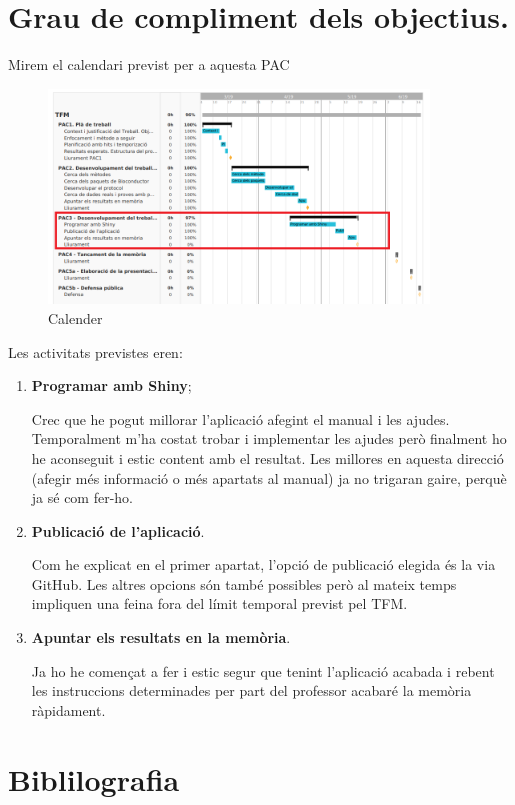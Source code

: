 \documentclass[]{article}
\begin{document}
\section{Grau de compliment dels objectius.}
Mirem el calendari previst per a aquesta PAC
\begin{figure}[H]
\centering
\includegraphics[width=0.9\textwidth]{Calender.png} 
\caption{Calender}
\end{figure}

Les activitats previstes eren:
\begin{enumerate}
\item \textbf{Programar amb Shiny};

Crec que he pogut millorar l'aplicació afegint el manual i les ajudes. Temporalment m'ha costat trobar i implementar les ajudes però finalment ho he aconseguit i estic content amb el resultat. Les millores en aquesta direcció (afegir més informació o més apartats al manual) ja no trigaran gaire, perquè ja sé com fer-ho.
\item \textbf{Publicació de l'aplicació}.

Com he explicat en el primer apartat, l’opció de publicació elegida és la via GitHub. Les altres opcions són també possibles però al mateix temps impliquen una feina fora del límit temporal previst pel TFM. 

\item \textbf{Apuntar els resultats en la memòria}.

Ja ho he començat a fer i estic segur que tenint l'aplicació acabada i rebent les instruccions determinades per part del professor acabaré la memòria ràpidament. 

\end{enumerate}

\section*{Biblilografia}

\begingroup
\renewcommand{\section}[2]{}%

\endgroup

\end{document}
